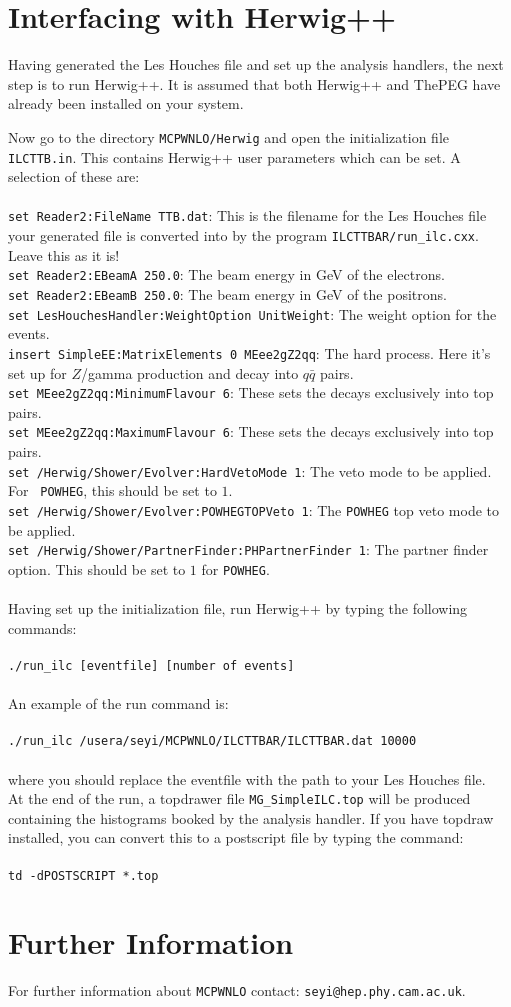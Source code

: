 \documentclass[12pt,a4paper,oneside]{article}
\begin{document}
\section{Interfacing with \textsf{Herwig++}}
Having generated the Les Houches file and set up the analysis handlers, the next step is to
run \textsf{Herwig++}. It is assumed that both \textsf{Herwig++} and \textsf{ThePEG} have
already been installed on your system. 

Now go to the directory {\tt MCPWNLO/Herwig} and open the initialization file {\tt
  ILCTTB.in}. This contains \textsf{Herwig++} user parameters which can be set. A selection of
these are:\\
\\
{\tt set Reader2:FileName TTB.dat}: This is the filename for the Les Houches file your
generated file is converted into by the program {\tt ILCTTBAR/run\_ilc.cxx}. Leave this
as it is! \\
{\tt set Reader2:EBeamA 250.0}: The beam energy in GeV of the electrons. \\
{\tt set Reader2:EBeamB 250.0}: The beam energy in GeV of the positrons.\\
{\tt set LesHouchesHandler:WeightOption UnitWeight}: The weight option for the
events. \\
{\tt insert SimpleEE:MatrixElements 0 MEee2gZ2qq}: The hard process. Here it's set up for
$Z$/gamma production and decay into $q \bar{q}$ pairs.\\
{\tt set MEee2gZ2qq:MinimumFlavour 6}: These sets the decays exclusively into top pairs. \\
{\tt set MEee2gZ2qq:MaximumFlavour 6}: These sets the decays exclusively into top pairs. \\
{\tt set /Herwig/Shower/Evolver:HardVetoMode 1}: The veto mode to be applied. For {\tt
  POWHEG}, this should be set to $1$.\\
{\tt set /Herwig/Shower/Evolver:POWHEGTOPVeto 1}: The {\tt POWHEG} top veto mode to be
applied.\\
{\tt set /Herwig/Shower/PartnerFinder:PHPartnerFinder 1}: The partner finder option. This
should be set to $1$ for {\tt POWHEG}.\\
\\
Having set up the initialization file, run \textsf{Herwig++} by typing the following
commands: \\
\\
{\tt ./run\_ilc [eventfile] [number of events]} \\
\\
An example of the run
command is:\\
\\
{\tt ./run\_ilc /usera/seyi/MCPWNLO/ILCTTBAR/ILCTTBAR.dat 10000}\\
\\
where you should replace the eventfile with the path to your Les Houches file.
\\
  At the end of the run, a topdrawer file {\tt MG\_SimpleILC.top}  will be
  produced containing the histograms booked by the analysis handler. If you have topdraw
  installed, you can convert this to a postscript file by typing the command:\\
\\
{\tt td -dPOSTSCRIPT  *.top}
\section{Further Information}
For further information about {\tt MCPWNLO} contact: {\tt seyi@hep.phy.cam.ac.uk}.


\end{document}
